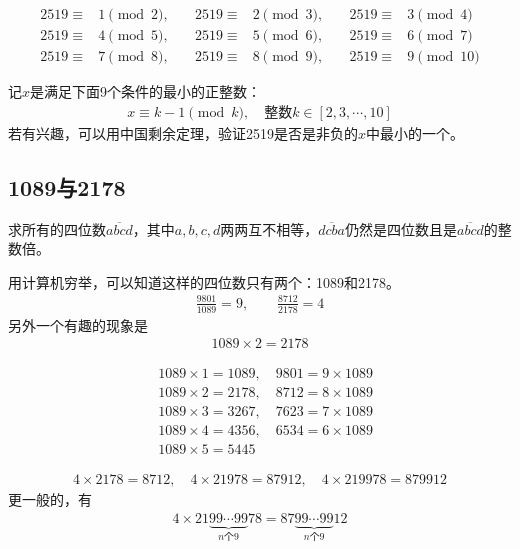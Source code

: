 \begin{align*}
  2519 \equiv{}& 1\pmod2,\quad & 2519 \equiv{}& 2\pmod3,\quad & 2519 \equiv{}& 3\pmod4 \\
  2519 \equiv{}& 4\pmod5,\quad & 2519 \equiv{}& 5\pmod6,\quad & 2519 \equiv{}& 6\pmod7 \\
  2519 \equiv{}& 7\pmod8,\quad & 2519 \equiv{}& 8\pmod9,\quad & 2519 \equiv{}& 9\pmod{10}
\end{align*}

记$x$是满足下面9个条件的最小的正整数：
\begin{align*}
  x\equiv k-1\pmod k, \quad \text{整数}k\in[2,3,\cdots,10]
\end{align*}
若有兴趣，可以用中国剩余定理，验证2519是否是非负的$x$中最小的一个。

\subsection{1089与2178}
\label{sec:number-1089}

\begin{example}
  求所有的四位数$\overline{abcd}$，其中$a,b,c,d$两两互不相等，$\overline{dcba}$仍然是四位数且是$\overline{abcd}$的整数倍。
\end{example}
用计算机穷举，可以知道这样的四位数只有两个：1089和2178。
\begin{align*}
  \frac{9801}{1089} = 9, \quad\quad \frac{8712}{2178} = 4
\end{align*}
另外一个有趣的现象是
\begin{align*}
  1089 \times 2 = 2178
\end{align*}

\begin{align*}
  & 1089\times 1 = 1089, \quad 9801 = 9\times 1089\\
  & 1089\times 2 = 2178, \quad 8712 = 8\times 1089\\
  & 1089\times 3 = 3267, \quad 7623 = 7\times 1089\\
  & 1089\times 4 = 4356, \quad 6534 = 6\times 1089\\
  & 1089\times 5 = 5445
\end{align*}

\begin{align*}
   4\times 2178 = 8712,\quad 4\times 21978 = 87912,\quad 4\times 219978 = 879912
\end{align*}
更一般的，有
\begin{align*}
  4\times21\underbrace{99\cdots99}_{n\text{个}9}78 = 87\underbrace{99\cdots99}_{n\text{个}9}12
\end{align*}


